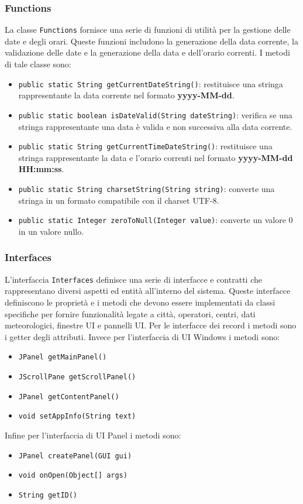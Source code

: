 \subsubsection{Functions}
La classe \texttt{Functions} fornisce una serie di funzioni di utilità per la gestione delle date e degli orari.
Queste funzioni includono la generazione della data corrente, la validazione delle date e la generazione della data e dell'orario correnti.
I metodi di tale classe sono:
\begin{itemize}
    \item \texttt{public static String getCurrentDateString()}: restituisce una stringa rappresentante la data corrente nel formato \textbf{yyyy-MM-dd}.
    \item \texttt{public static boolean isDateValid(String dateString)}: verifica se una stringa rappresentante una data è valida e non successiva alla data corrente.
    \item \texttt{public static String getCurrentTimeDateString()}: restituisce una stringa rappresentante la data e l'orario correnti nel formato \textbf{yyyy-MM-dd HH:mm:ss}.
    \item \texttt{public static String charsetString(String string)}: converte una stringa in un formato compatibile con il charset UTF-8.
    \item \texttt{public static Integer zeroToNull(Integer value)}: converte un valore 0 in un valore nullo.
\end{itemize}

\subsubsection{Interfaces}
L'interfaccia \texttt{Interfaces} definisce una serie di interfacce e contratti che rappresentano diversi aspetti ed entità all'interno del sistema.
Queste interfacce definiscono le proprietà e i metodi che devono essere implementati da classi specifiche per fornire funzionalità legate a città, operatori, centri, dati meteorologici, finestre UI e pannelli UI.
Per le interfacce dei record i metodi sono i getter degli attributi.
Invece per l'interfaccia di UI Windows i metodi sono:
\begin{itemize}
    \item \texttt{JPanel getMainPanel()}
    \item \texttt{JScrollPane getScrollPanel()}
    \item \texttt{JPanel getContentPanel()}
    \item \texttt{void setAppInfo(String text)}
\end{itemize}
Infine per l'interfaccia di UI Panel i metodi sono:
\begin{itemize}
    \item \texttt{JPanel createPanel(GUI gui)}
    \item \texttt{void onOpen(Object[] args)}
    \item \texttt{String getID()}
\end{itemize}

